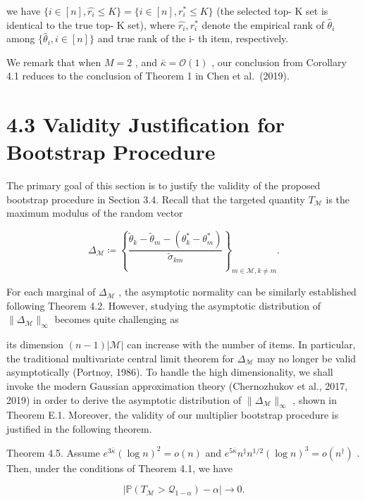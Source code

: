 we have
\(\{i\in [n],\widehat{r_{i}}\leq K\} = \{i\in [n],r_{i}^{*}\leq K\}\)
(the selected top- K set is identical to the true top- K set), where
\(\widehat{r_{i}},r_{i}^{*}\) denote the empirical rank of
\(\widehat{\theta}_{i}\) among \(\{\widehat{\theta}_{i},i\in [n]\}\) and
true rank of the i- th item, respectively.

We remark that when \(M = 2\) , and \(\bar{\kappa} = \mathcal{O}(1)\) ,
our conclusion from Corollary 4.1 reduces to the conclusion of Theorem 1
in Chen et al.~(2019).

\section{4.3 Validity Justification for Bootstrap
Procedure}\label{validity-justification-for-bootstrap-procedure}

The primary goal of this section is to justify the validity of the
proposed bootstrap procedure in Section 3.4. Recall that the targeted
quantity \(T_{\mathcal{M}}\) is the maximum modulus of the random vector

\[
\Delta_{\mathcal{M}}\coloneqq \left\{\frac{\widetilde{\theta}_{k} - \widetilde{\theta}_{m} - (\theta_{k}^{*} - \theta_{m}^{*})}{\widetilde{\sigma}_{km}}\right\}_{m\in \mathcal{M},k\neq m}.
\]

For each marginal of \(\Delta_{\mathcal{M}}\) , the asymptotic normality
can be similarly established following Theorem 4.2. However, studying
the asymptotic distribution of \(\| \Delta_{\mathcal{M}}\|_{\infty}\)
becomes quite challenging as

its dimension \((n - 1)|\mathcal{M}|\) can increase with the number of
items. In particular, the traditional multivariate central limit theorem
for \(\Delta_{\mathcal{M}}\) may no longer be valid asymptotically
(Portnoy, 1986). To handle the high dimensionality, we shall invoke the
modern Gaussian approximation theory (Chernozhukov et al., 2017, 2019)
in order to derive the asymptotic distribution of
\(\| \Delta_{\mathcal{M}}\|_{\infty}\) , shown in Theorem E.1. Moreover,
the validity of our multiplier bootstrap procedure is justified in the
following theorem.

Theorem 4.5. Assume \(e^{3\bar{\kappa}}(\log n)^2 = o(n)\) and
\(e^{5\bar{\kappa}}n^{\ddagger}n^{1 / 2}(\log n)^3 = o(n^{\dagger})\) .
Then, under the conditions of Theorem 4.1, we have

\[
|\mathbb{P}(T_{\mathcal{M}} > \mathcal{Q}_{1 - \alpha}) - \alpha |\to 0.
\]

